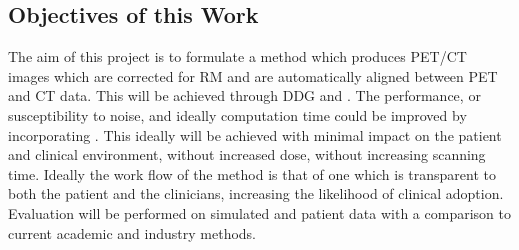             
        \subsection{Objectives of this Work} \label{sec:objectives_of_this_work}
            The aim of this project is to formulate a method which produces \gls{PET}/\gls{CT} images which are corrected for \gls{RM} and are automatically aligned between \gls{PET} and \gls{CT} data. This will be achieved through \gls{DDG} and . %
            The performance, or susceptibility to noise, and ideally computation time could be improved by incorporating . This ideally will be achieved with minimal impact on the patient and clinical environment, without increased dose, without increasing scanning time. Ideally the work flow of the method is that of one which is transparent to both the patient and the clinicians, increasing the likelihood of clinical adoption. Evaluation will be performed on simulated and patient data with a comparison to current academic and industry methods.
        
